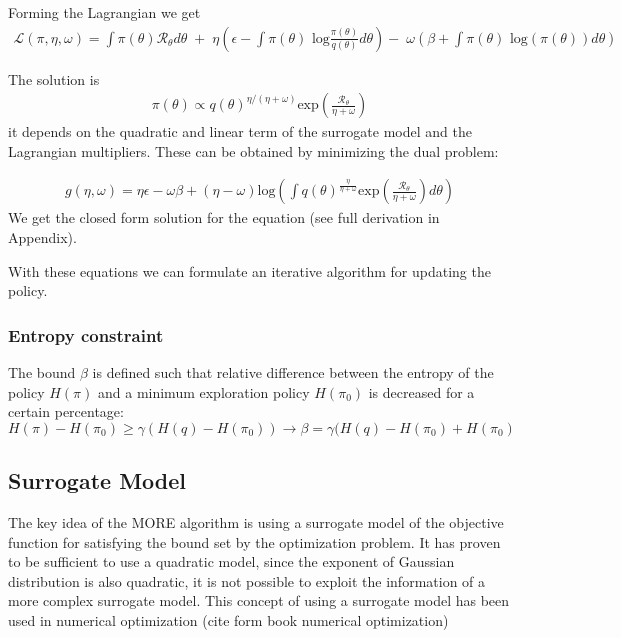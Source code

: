 Forming the Lagrangian we get
\begin{align} \mathcal{L}(\pi, \eta, \omega) = 
\int \pi(\theta) \mathcal{R}_{\theta} d\theta \; + \; 
\eta  \left(\epsilon - \int \pi(\theta) \text{ log}
 \frac{\pi(\theta)}{q(\theta)} d\theta\right)
 - \; \omega \left(\beta + \int \pi(\theta) \text{ log}(\pi(\theta)) d\theta\right)
\end{align}

The solution is
\begin{align}
\pi(\theta) \propto q(\theta)^{\eta/(\eta+\omega)} 
\text{exp}\left(\frac{\mathcal{R}_\theta}{\eta + \omega}\right)
\end{align}
it depends on the quadratic and linear term of the surrogate model and the
Lagrangian multipliers. These can be obtained by minimizing the dual problem:

\begin{align}
  g(\eta,\omega) = \eta\epsilon - \omega\beta + (\eta - \omega) \text{log}
\left(\int q(\theta)^{\frac{\eta}{\eta + \omega}}
  \text{exp}\left(\frac{\mathcal{R}_\theta}{\eta + \omega}\right) d\theta \right)
\end{align}
We get the closed form solution for the equation
(see full derivation in Appendix).

With these equations we can formulate an iterative algorithm for updating the policy.

\subsubsection{Entropy constraint}
The bound $\beta$ is defined such that relative difference between the entropy
of the policy $H(\pi)$ and a minimum exploration policy $H(\pi_0)$ is decreased
for a certain percentage:
$$ H(\pi) - H(\pi_0) \geq \gamma (H(q) - H(\pi_0))
\rightarrow \beta = \gamma (H(q) - H(\pi_0) + H(\pi_0) $$

\subsection{Surrogate Model}
The key idea of the MORE algorithm is using a surrogate model of the objective function
for satisfying the bound set by the optimization problem. It has proven to be
sufficient to use a quadratic model, since the exponent of Gaussian distribution
is also quadratic, it is not possible to exploit the information of a more
complex surrogate model. This concept of using a surrogate model has been used
in numerical optimization (cite form book numerical optimization)


